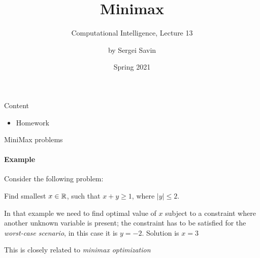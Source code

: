 \documentclass{beamer}
\title{ Minimax }
\subtitle{Computational Intelligence, Lecture 13}
\author{by Sergei Savin}
\date{Spring 2021}
\begin{document}
\maketitle



\begin{frame}{Content}

\begin{itemize}
\item Homework
\end{itemize}

\end{frame}



\begin{frame}{MiniMax problems}
\framesubtitle{Example}
\begin{flushleft}

Consider the following problem: 

\begin{example}
Find smallest $x \in \mathbb{R}$, such that $x + y \geq 1$, where $|y| \leq 2$.
\end{example}

\bigskip

In that example we need to find optimal value of $x$ subject to a constraint where another unknown variable is present; the constraint has to be satisfied for the \emph{worst-case scenario}, in this case it is $y = -2$. Solution is $x = 3$

\bigskip

This is closely related to \emph{minimax optimization}
 
\end{flushleft}
\end{frame}
\end{document}
